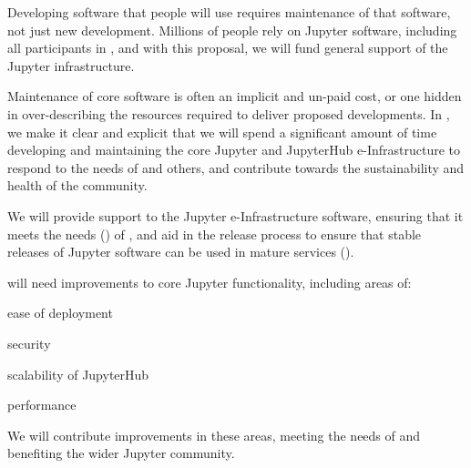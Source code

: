 \begin{task}[
  title=Maintenance of open source reproducibility software,
  id=maintenance,
  lead=SRL,
  PM=6,
  wphases={0-36!.17},
  partners={QS}
]

  


Developing software that people will use requires maintenance of that software,
not just new development. Millions of people rely on Jupyter software, including
all participants in \TheProject, and with this proposal, we will fund general
support of the Jupyter infrastructure.

Maintenance of core software is often an implicit and un-paid cost, or one
hidden in over-describing the resources required to deliver proposed
developments. In \TheProject, we make it clear and explicit that we will spend a
significant amount of time developing and maintaining the core Jupyter and
JupyterHub e-Infrastructure to respond to the needs of \TheProject and others,
and contribute towards the sustainability and health of the community.

We will provide support to the Jupyter e-Infrastructure software, ensuring that
it meets the needs () of \TheProject, and
aid in the release process to ensure that stable releases of Jupyter software
can be used in mature \TheProject services ().

  \TheProject will need improvements to core Jupyter functionality, including areas of:

  \begin{compactenum}
    \item ease of deployment
    \item security
    \item scalability of JupyterHub
    \item performance
  \end{compactenum}

  We will contribute improvements in these areas,
  meeting the needs of \TheProject and benefiting the wider Jupyter
  community.

\end{task}
